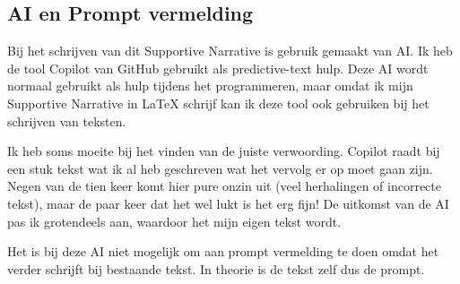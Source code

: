\printbibliography

\subsection*{AI en Prompt vermelding}
Bij het schrijven van dit Supportive Narrative is gebruik gemaakt van AI. Ik heb de tool Copilot van GitHub gebruikt als predictive-text hulp. Deze AI wordt normaal gebruikt als hulp tijdens het programmeren, maar omdat ik mijn Supportive Narrative in LaTeX schrijf kan ik deze tool ook gebruiken bij het schrijven van teksten.

Ik heb soms moeite bij het vinden van de juiste verwoording. Copilot raadt bij een stuk tekst wat ik al heb geschreven wat het vervolg er op moet gaan zijn. Negen van de tien keer komt hier pure onzin uit (veel herhalingen of incorrecte tekst), maar de paar keer dat het wel lukt is het erg fijn! De uitkomst van de AI pas ik grotendeels aan, waardoor het mijn eigen tekst wordt.

Het is bij deze AI niet mogelijk om aan prompt vermelding te doen omdat het verder schrijft bij bestaande tekst. In theorie is de tekst zelf dus de prompt. 
